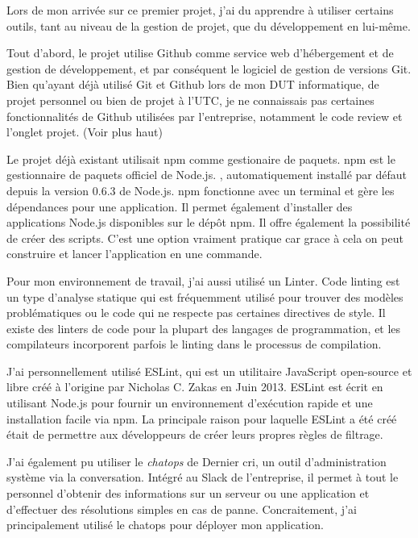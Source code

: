 \documentclass[12pt,a4paper]{article}
\begin{document}
  \bigskip

  Lors de mon arrivée sur ce premier projet, j'ai du apprendre à utiliser
  certains outils, tant au niveau de la gestion de projet, que du
  développement en lui-même.

  \bigskip

  Tout d'abord, le projet utilise Github comme service web d'hébergement
  et de gestion de développement, et par conséquent le logiciel de gestion
  de versions Git. Bien qu'ayant déjà utilisé Git et Github lors de mon
  DUT informatique, de projet personnel ou bien de projet à l'UTC, je ne
  connaissais pas certaines fonctionnalités de Github utilisées par
  l'entreprise, notamment le code review et l'onglet projet. (Voir plus
  haut)

  \bigskip

  Le projet déjà existant utilisait npm comme gestionaire de paquets. npm
  est le gestionnaire de paquets officiel de Node.js. , automatiquement
  installé par défaut depuis la version 0.6.3 de Node.js. npm fonctionne
  avec un terminal et gère les dépendances pour une application. Il permet
  également d'installer des applications Node.js disponibles sur le dépôt
  npm. Il offre également la possibilité de créer des scripts. C'est une
  option vraiment pratique car grace à cela on peut construire et lancer
  l'application en une commande.

  \bigskip

  Pour mon environnement de travail, j'ai aussi utilisé un Linter. Code
  linting est un type d'analyse statique qui est fréquemment utilisé pour
  trouver des modèles problématiques ou le code qui ne respecte pas
  certaines directives de style. Il existe des linters de code pour la
  plupart des langages de programmation, et les compilateurs incorporent
  parfois le linting dans le processus de compilation.

  \bigskip

  J'ai personnellement utilisé ESLint, qui est un utilitaire JavaScript
  open-source et libre créé à l'origine par Nicholas C. Zakas en Juin
  2013. ESLint est écrit en utilisant Node.js pour fournir un
  environnement d'exécution rapide et une installation facile via npm. La
  principale raison pour laquelle ESLint a été créé était de permettre aux
  développeurs de créer leurs propres règles de filtrage.

  \bigskip

  J'ai également pu utiliser le \emph{chatops} de Dernier cri, un outil
  d'administration système via la conversation. Intégré au Slack de
  l'entreprise, il permet à tout le personnel d'obtenir des informations
  sur un serveur ou une application et d'effectuer des résolutions simples
  en cas de panne. Concraitement, j'ai principalement utilisé le chatops
  pour déployer mon application.
\end{document}
